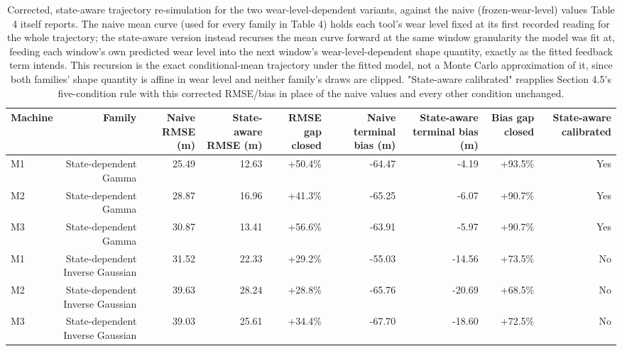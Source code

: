 \begin{table}[t]
\centering
\caption{Corrected, state-aware trajectory re-simulation for the two wear-level-dependent variants, against the naive (frozen-wear-level) values Table 4 itself reports. The naive mean curve (used for every family in Table 4) holds each tool's wear level fixed at its first recorded reading for the whole trajectory; the state-aware version instead recurses the mean curve forward at the same window granularity the model was fit at, feeding each window's own predicted wear level into the next window's wear-level-dependent shape quantity, exactly as the fitted feedback term intends. This recursion is the exact conditional-mean trajectory under the fitted model, not a Monte Carlo approximation of it, since both families' shape quantity is affine in wear level and neither family's draws are clipped. "State-aware calibrated" reapplies Section 4.5's five-condition rule with this corrected RMSE/bias in place of the naive values and every other condition unchanged.}
\label{tab:state-aware-resimulation}
\begin{tabular}{lrrrrrrrr}
\toprule
Machine & Family & Naive RMSE (\textmu{}m) & State-aware RMSE (\textmu{}m) & RMSE gap closed & Naive terminal bias (\textmu{}m) & State-aware terminal bias (\textmu{}m) & Bias gap closed & State-aware calibrated \\
\midrule
M1 & State-dependent Gamma & 25.49 & 12.63 & +50.4\% & -64.47 & -4.19 & +93.5\% & Yes \\
M2 & State-dependent Gamma & 28.87 & 16.96 & +41.3\% & -65.25 & -6.07 & +90.7\% & Yes \\
M3 & State-dependent Gamma & 30.87 & 13.41 & +56.6\% & -63.91 & -5.97 & +90.7\% & Yes \\
M1 & State-dependent Inverse Gaussian & 31.52 & 22.33 & +29.2\% & -55.03 & -14.56 & +73.5\% & No \\
M2 & State-dependent Inverse Gaussian & 39.63 & 28.24 & +28.8\% & -65.76 & -20.69 & +68.5\% & No \\
M3 & State-dependent Inverse Gaussian & 39.03 & 25.61 & +34.4\% & -67.70 & -18.60 & +72.5\% & No \\
\bottomrule
\end{tabular}
\end{table}

